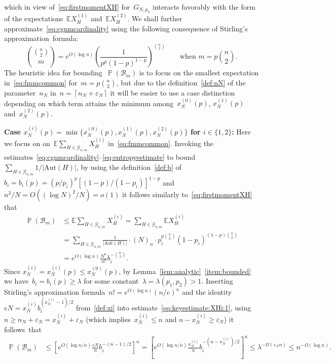 \documentclass{article}
\newcommand{\eps}{\varepsilon}
\newcommand{\E}{\mathbb{E}}
\newcommand{\cG}{\mathcal{G}}
\newcommand\lrpar[1]{\left(#1\right)}
\newcommand\abs[1]{\left|#1\right|}
\newcommand\ceil[1]{\left\lceil #1 \right \rceil}
\newcommand{\xone}{x^{(1)}}
\newcommand{\xtwo}{x^{(2)}}
\newcommand{\xot}{x^{(0)}}
\newcommand{\Xone}{X^{(1)}}
\newcommand{\Xtwo}{X^{(2)}}
\newcommand{\nN}{n_N}
\newcommand{\eve}{\mathcal{B}}
\newcommand{\Aut}{\mathrm{Aut}}
\DeclareMathOperator{\pr}{\mathbb{P}}
\newcommand\lrsqpar[1]{\left[#1\right]}
\newcommand\bigcpar[1]{\bigl\{#1\bigr\}}
\begin{document}
which in view of~\eqref{eq:firstmomentXH} for~$G_{N,p_2}$ interacts favorably with the form of the expectations~$\E \Xone_H$ and~$\E\Xtwo_H$. 
We shall further approximate~\eqref{eq:cgnmcardinality} using the following consequence of Stirling's approximation~formula:
\begin{equation}\label{eq:entropyestimate}
\binom{\binom{n}{2}}{m} 
= e^{O(\log n)} \lrpar{\frac{1}{p^p(1-p)^{1-p}}}^{\binom{n}{2}} 
\qquad \text{when~$m=p\binom{n}{2}$.}
\end{equation}
The heuristic idea for bounding~$\pr(\eve_m)$ is to focus on the smallest expectation in~\eqref{eq:fmmcommon}  for~$m=p\binom{n}{2}$, 
but due to the definition~\eqref{def:nN} of the parameter~$n_N$ in~${n=\ceil{\nN+\eps_N}}$ it will be easier to use a case distinction depending on which term attains the minimum among~$\xot_N(p)$, $\xone_N(p)$ and~$\xtwo_N(p)$. 

\textbf{Case $x^{(i)}_N(p)=\min\bigcpar{\xot_N(p),\xone_N(p),\xtwo_N(p)}$ for $i\in\{1,2\}$:} 
Here we focus on on~$\E\sum_{H\in \mathcal{G}_{n,m}} X^{(i)}_H$ in~\eqref{eq:fmmcommon}.
Invoking the estimates~\eqref{eq:cgnmcardinality}--\eqref{eq:entropyestimate} to bound~$\sum_{H \in \cG_{n,m}}1/\abs{\Aut(H)}$, 
by using the definition~\eqref{def:b} of~$b_i=b_i(p) = (p/p_i)^p[(1-p)/(1-p_i)]^{1-p}$ and~$n^2/N=O((\log N)^2/N) = o(1)$ it follows similarly to~\eqref{eq:firstmomentXH} that 
\begin{equation}\label{eq:keyestimate:XHi:1}
 \begin{split}
     \pr(\eve_m)  & \le \E\sum_{H\in \mathcal{G}_{n,m}} X^{(i)}_H = \sum_{H\in \mathcal{G}_{n,m}} \E X^{(i)}_H\\
     & = \sum_{H \in \cG_{n,m}} \frac{1}{\abs{\Aut(H)}}
     \cdot (N)_n \cdot p_i^{p\binom{n}{2}}(1-p_i)^{(1-p)\binom{n}{2}} \\
     & = e^{O(\log n)} \frac{N^n}{n!} 
  b_i^{-\binom{n}{2}} .
 \end{split}
 \end{equation}
Since $x^{(i)}_N=x^{(i)}_N(p)\le \xot_N(p)$, by Lemma~\ref{lem:analytic}~\ref{item:bounded} we have~$b_i=b_i(p)\ge \lambda$ for some constant~${\lambda=\lambda(p_1,p_2)>1}$. 
Inserting Stirling's approximation formula~$n! = e^{O(\log n)}(n/e)^{n}$ and the identity~$eN = x^{(i)}_Nb_i^{(x^{(i)}_N-1)/2}$ from~\eqref{def:xi} into estimate~\eqref{eq:keyestimate:XHi:1}, 
using~$n \ge \nN+\eps_N =  x_N^{(i)} + \eps_N$ (which implies~$x_N^{(i)} \le n$ and $n-x_N^{(i)} \geq \eps_N$) it follows~that
\begin{equation}\label{eq:keyestimatebi1}
 \begin{split}
     \pr(\eve_m) & \le \lrsqpar{e^{O(\log n/n)}\tfrac{eN}{n}b_i^{-(n-1)/2}}^n
     = \lrsqpar{e^{O(\log n/n)}\tfrac{x^{(i)}_N}{n} b_i^{-(n-x^{(i)}_N)/2}}^n \le \lambda^{-\Omega(\eps_Nn)} \le n^{-\Omega(\log n)}.
 \end{split}
 \end{equation}
 
\end{document}
